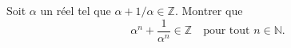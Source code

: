 Soit $\alpha$ un réel tel que $\alpha + 1/\alpha \in \mathbb{Z}$. Montrer que
\[ \alpha^n + \frac{1}{\alpha^n} \in \mathbb{Z} \quad\text{pour tout } n \in \mathbb{N}. \]
